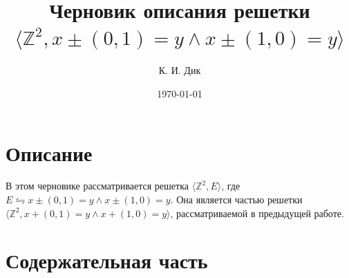 \documentclass[12pt,a4paper]{article}
\title{Черновик описания решетки $\langle \mathbb{Z}^2, x \pm (0,1) = y \wedge x \pm (1,0) = y \rangle$}
\author{К. И. Дик}
\date{\today}
\theoremstyle{namedStatement}
\theoremstyle{plain}
\theoremstyle{definition}
\begin{document}
 
\maketitle
\section{Описание}
В этом черновике рассматривается решетка $\langle \mathbb{Z}^2, E\rangle$, где $E \leftrightharpoons x \pm (0,1) = y \wedge x \pm (1,0) = y$. Она является частью решетки $\langle \mathbb{Z}^2, x + (0,1) = y \wedge x + (1, 0) = y\rangle$, рассматриваемой в предыдущей работе.

\section{Содержательная часть}



\end{document}
